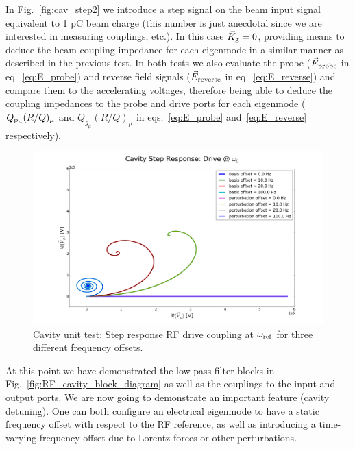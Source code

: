 \documentclass[a4paper,12pt]{article}
\begin{document}
In Fig.~\ref{fig:cav_step2} we introduce a step signal on the beam input signal equivalent to 1 pC beam charge (this number is just anecdotal since we are interested in measuring couplings, etc.). In this case $\vec K_{\rm g}=0$, providing means to deduce the beam coupling impedance for each eigenmode in a similar manner as described in the previous test. In both tests we also evaluate the probe ($\vec E_{\rm probe}$ in eq.~\ref{eq:E_probe}) and reverse field signals ($\vec E_{\rm reverse}$ in eq.~\ref{eq:E_reverse}) and compare them to the accelerating voltages, therefore being able to deduce the coupling impedances to the probe and drive ports for each eigenmode ($Q_{\rm p_{\mu}}(R/Q)_{\mu}$ and $Q_{g_{\mu}}(R/Q)_\mu$ in eqs.~\ref{eq:E_probe} and~\ref{eq:E_reverse} respectively).

\begin{figure}
\centering
\includegraphics[scale=0.24]{../figures/cavity_test_freqs.png}
\caption{Cavity unit test: Step response RF drive coupling at $\omega_{\rm ref}$ for three different frequency offsets.}
\label{fig:cav_step3}
\end{figure}

At this point we have demonstrated the low-pass filter blocks in Fig.~\ref{fig:RF_cavity_block_diagram} as well as the couplings to the input and output ports. We are now going to demonstrate an important feature (cavity detuning). One can both configure an electrical eigenmode to have a static frequency offset with respect to the RF reference, as well as introducing a time-varying frequency offset due to Lorentz forces or other perturbations.
\end{document}
